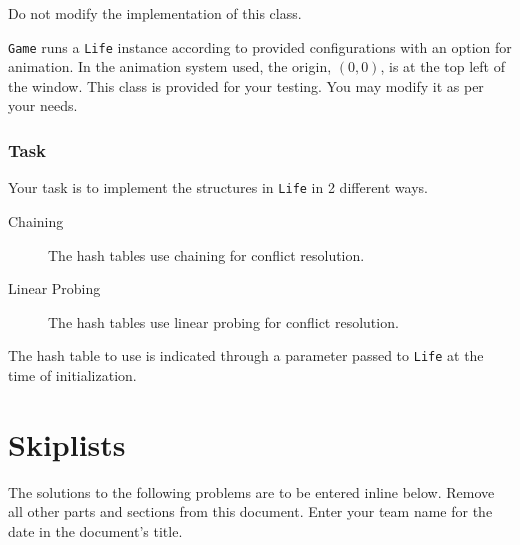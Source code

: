 \documentclass[addpoints]{exam}
\begin{document}
Do not modify the implementation of this class.

\texttt{Game} runs a \texttt{Life} instance according to provided configurations with an option for animation. In the animation system used, the origin, $(0,0)$, is at the top left of the window. This class is provided for your testing. You may modify it as per your needs.

\section{Task}

Your task is to implement the structures in \texttt{Life} in 2 different ways.
\begin{description}
\item[Chaining] The hash tables use chaining for conflict resolution.
\item[Linear Probing] The hash tables use linear probing for conflict resolution.
\end{description}
The hash table to use is indicated through a parameter passed to \texttt{Life} at the time of initialization.

\part{Skiplists}

The solutions to the following problems are to be entered inline below. Remove all other parts and sections from this document. Enter your team name for the date in the document's title.
\end{document}

